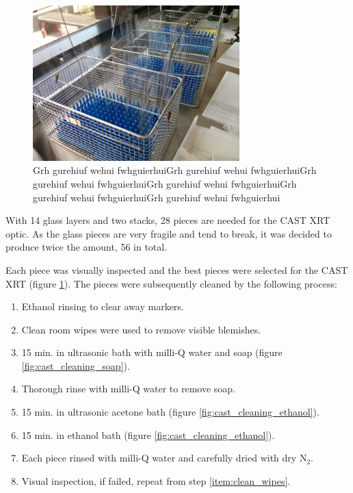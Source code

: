 \begin{figure}[htbp]
  \centering  \includegraphics[height=6cm]{figures/cast/pieces_for_cleaning.jpg}
  \caption{\footnotesize Grh gurehiuf wehui fwhguierhuiGrh gurehiuf wehui fwhguierhuiGrh gurehiuf wehui fwhguierhuiGrh gurehiuf wehui fwhguierhuiGrh gurehiuf wehui fwhguierhuiGrh gurehiuf wehui fwhguierhui}
  \label{fig:pieces_for_cleaning}
\end{figure}

With 14 glass layers and two stacks, 28 pieces are needed for the CAST XRT optic. As the glass pieces are very fragile and tend to break, it was decided to produce twice the amount, 56 in total.

Each piece was visually inspected and the best pieces were selected for the CAST XRT (figure \ref{fig:pieces_for_cleaning}). The pieces were subsequently cleaned by the following process:
\begin{enumerate}
  \item Ethanol rinsing to clear away markers.
  \item Clean room wipes were used to remove visible blemishes.\label{item:clean_wipes}
  \item 15 min. in ultrasonic bath with milli-Q water and soap (figure \ref{fig:cast_cleaning_soap}).
  \item Thorough rinse with milli-Q water to remove soap.
  \item 15 min. in ultrasonic acetone bath (figure \ref{fig:cast_cleaning_ethanol}).
  \item 15 min. in ethanol bath (figure \ref{fig:cast_cleaning_ethanol}).
  \item Each piece rinsed with milli-Q water and carefully dried with dry N$_2$.
  \item Visual inspection, if failed, repeat from step \ref{item:clean_wipes}.
\end{enumerate}

